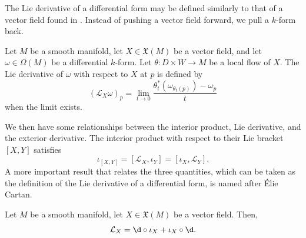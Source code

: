 \documentclass[a4paper,12pt]{article}
\begin{document}
The Lie derivative of a differential form may be defined similarly to that of a vector field found in .
Instead of pushing a vector field forward, we pull a $k$-form back.
\begin{definition}\label{def:lie_derivative_of_differential_form}
    Let $M$ be a smooth manifold, let $X \in \mathfrak{X}(M)$ be a vector field, and let $\omega \in \Omega(M)$ be a differential $k$-form.
    Let $\theta \colon D \times W \to M$ be a local flow of $X$.
    The Lie derivative of $\omega$ with respect to $X$ at $p$ is defined by
    \begin{equation}
        (\mathcal{L}_X \omega)_p = \lim_{t \to 0} \frac{\theta^*_t(\omega_{\theta_t(p)}) - \omega_p}{t}
    \end{equation}
    when the limit exists.
\end{definition}
We then have some relationships between the interior product, Lie derivative, and the exterior derivative.
The interior product with respect to their Lie bracket $[X, Y]$ satisfies
\begin{equation}
    \iota_{[X, Y]} = [\mathcal{L}_X, \iota_Y] = [\iota_X, \mathcal{L}_Y].
\end{equation}
A more important result that relates the three quantities, which can be taken as the definition of the Lie derivative of a differential form, is named after \'{E}lie Cartan.
\begin{theorem}\label{thm:cartan's_magic_formula}
    Let $M$ be a smooth manifold, let $X \in \mathfrak{X}(M)$ be a vector field.
    Then,
    \begin{equation}\label{eq:cartan's_magic_formula}
        \mathcal{L}_X = \d \circ \iota_X + \iota_X \circ \d.
    \end{equation}
\end{theorem}
\end{document}
